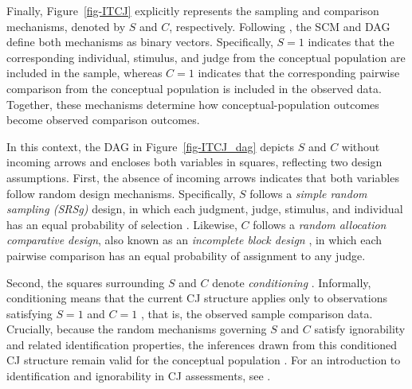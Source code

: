 \documentclass[
  authoryear,
  review,
  1p]{elsarticle}
\begin{document}
Finally, Figure~\ref{fig-ITCJ} explicitly represents the sampling and
comparison mechanisms, denoted by \(S\) and \(C\), respectively.
Following \citet{Rivera_et_al_2025}, the SCM and DAG define both
mechanisms as binary vectors. Specifically, \(S=1\) indicates that the
corresponding individual, stimulus, and judge from the conceptual
population are included in the sample, whereas \(C=1\) indicates that
the corresponding pairwise comparison from the conceptual population is
included in the observed data. Together, these mechanisms determine how
conceptual-population outcomes become observed comparison outcomes.

In this context, the DAG in Figure~\ref{fig-ITCJ_dag} depicts \(S\) and
\(C\) without incoming arrows and encloses both variables in squares,
reflecting two design assumptions. First, the absence of incoming arrows
indicates that both variables follow random design mechanisms.
Specifically, \(S\) follows a \emph{simple random sampling (SRSg)}
design, in which each judgment, judge, stimulus, and individual has an
equal probability of selection \citep{Lawson_2015}. Likewise, \(C\)
follows a \emph{random allocation comparative design}, also known as an
\emph{incomplete block design} \citep{Bramley_2015, Lawson_2015}, in
which each pairwise comparison has an equal probability of assignment to
any judge.

Second, the squares surrounding \(S\) and \(C\) denote
\emph{conditioning}
\citep{Bareinboim_et_al_2014, Schuessler_et_al_2023}. Informally,
conditioning means that the current CJ structure applies only to
observations satisfying \(S=1\) and \(C=1\)
\citep{Neal_2020, McElreath_2020}, that is, the observed sample
comparison data. Crucially, because the random mechanisms governing
\(S\) and \(C\) satisfy ignorability \citep{Schuessler_et_al_2023} and
related identification properties, the inferences drawn from this
conditioned CJ structure remain valid for the conceptual population
\citep{Morgan_et_al_2014, Neal_2020}. For an introduction to
identification and ignorability in CJ assessments, see
\citet{Rivera_et_al_2025}.
\end{document}
